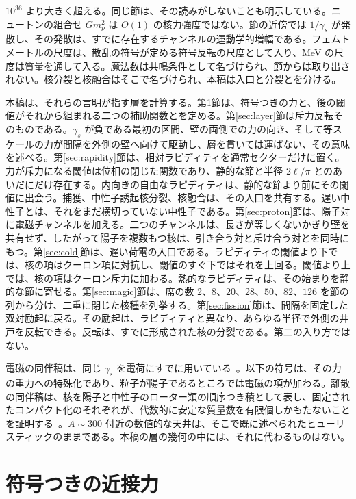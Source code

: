\documentclass[a4paper]{article}
\begin{document}
\(10^{36}\) より大きく超える。同じ節は、その読みがしないことも明示している。ニュートンの組合せ \(G m_p^2\) は \(O(1)\) の核力強度ではない。節の近傍では \(1/\gamma_s\) が発散し、その発散は、すでに存在するチャンネルの運動学的増幅である。フェムトメートルの尺度は、散乱の符号が定める符号反転の尺度として入り、MeV の尺度は質量を通して入る。魔法数は共鳴条件として名づけられ、節からは取り出されない。核分裂と核融合はそこで名づけられ、本稿は入口と分裂とを分ける。

本稿は、それらの言明が指す層を計算する。第\ref{sec:force}節は、符号つきの力と、後の閾値がそれから組まれる二つの補助関数とを定める。第\ref{sec:layer}節は斥力反転そのものである。\(\gamma_s\) が負である最初の区間、壁の両側での力の向き、そして等スケールの力が間隔を外側の壁へ向けて駆動し、層を貫いては運ばない、その意味を述べる。第\ref{sec:rapidity}節は、相対ラピディティを通常セクターだけに置く。力が斥力になる閾値は位相の閉じた関数であり、静的な節と半径 \(2\ell/\pi\) とのあいだにだけ存在する。内向きの自由なラピディティは、静的な節より前にその閾値に出会う。捕獲、中性子誘起核分裂、核融合は、その入口を共有する。遅い中性子とは、それをまだ横切っていない中性子である。第\ref{sec:proton}節は、陽子対に電磁チャンネルを加える。二つのチャンネルは、長さが等しくないかぎり壁を共有せず、したがって陽子を複数もつ核は、引き合う対と斥け合う対とを同時にもつ。第\ref{sec:cold}節は、遅い荷電の入口である。ラピディティの閾値より下では、核の項はクーロン項に対抗し、閾値のすぐ下ではそれを上回る。閾値より上では、核の項はクーロン斥力に加わる。熱的なラピディティは、その始まりを静的な節に寄せる。第\ref{sec:magic}節は、席の数 \(2\)、\(8\)、\(20\)、\(28\)、\(50\)、\(82\)、\(126\) を節の列から分け、二重に閉じた核種を列挙する。第\ref{sec:fission}節は、間隔を固定した双対励起に戻る。その励起は、ラピディティと異なり、あらゆる半径で外側の井戸を反転できる。反転は、すでに形成された核の分裂である。第二の入り方ではない。

電磁の同伴稿は、同じ \(\gamma_s\) を電荷にすでに用いている~\cite{dst-shell}。以下の符号は、その力の重力への特殊化であり、粒子が陽子であるところでは電磁の項が加わる。離散の同伴稿は、核を陽子と中性子のローター類の順序つき積として表し、固定されたコンパクト化のそれぞれが、代数的に安定な質量数を有限個しかもたないことを証明する~\cite{dst-dio}。\(A\sim 300\) 付近の数値的な天井は、そこで既に述べられたヒューリスティックのままである。本稿の層の幾何の中には、それに代わるものはない。

\section{符号つきの近接力}
\label{sec:force}
\end{document}
